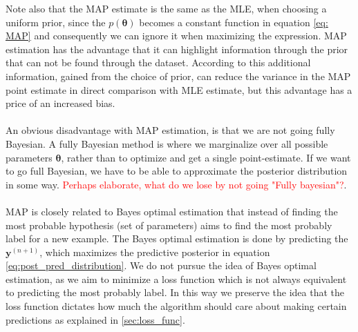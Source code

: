 Note also that the MAP estimate is the same as the MLE, when choosing a uniform prior, since the $p(\boldsymbol{\theta})$ becomes a constant function in equation \ref{eq: MAP} and consequently we can ignore it when maximizing the expression. MAP estimation has the advantage that it can highlight information through the prior that can not be found through the dataset. According to \cite{Goodfellow-et-al-2016} this additional information, gained from the choice of prior, can reduce the variance in the MAP point estimate in direct comparison with MLE estimate, but this advantage has a price of an increased bias.\\
\\
An obvious disadvantage with MAP estimation, is that we are not going fully Bayesian. A fully Bayesian method is where we marginalize over all possible parameters $\boldsymbol{\theta}$, rather than to optimize and get a single point-estimate. If we want to go full Bayesian, we have to be able to approximate the posterior distribution in some way. \textcolor{red}{Perhaps elaborate, what do we lose by not going "Fully bayesian"?}. \\
\\
MAP is closely related to Bayes optimal estimation that instead of finding the most probable hypothesis (set of parameters) aims to find the most probably label for a new example. The Bayes optimal estimation is done by predicting the $\boldsymbol{y}^{(n+1)}$, which maximizes the predictive posterior in equation \ref{eq:post_pred_distribution}. We do not pursue the idea of Bayes optimal estimation, as we aim to minimize a loss function which is not always equivalent to predicting the most probably label. In this way we preserve the idea that the loss function dictates how much the algorithm should care about making certain predictions as explained in \ref{sec:loss_func}.

